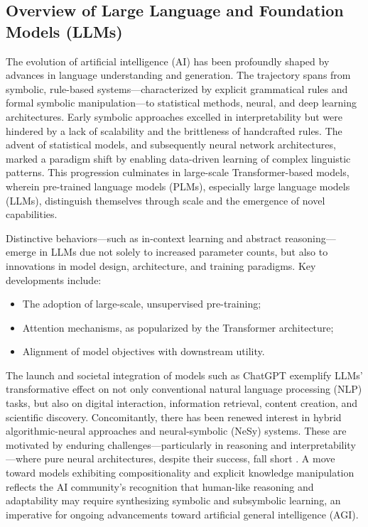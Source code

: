 \documentclass[11pt]{article}
\begin{document}
\subsection{Overview of Large Language and Foundation Models (LLMs)}

The evolution of artificial intelligence (AI) has been profoundly shaped by advances in language understanding and generation. The trajectory spans from symbolic, rule-based systems—characterized by explicit grammatical rules and formal symbolic manipulation—to statistical methods, neural, and deep learning architectures. Early symbolic approaches excelled in interpretability but were hindered by a lack of scalability and the brittleness of handcrafted rules. The advent of statistical models, and subsequently neural network architectures, marked a paradigm shift by enabling data-driven learning of complex linguistic patterns. This progression culminates in large-scale Transformer-based models, wherein pre-trained language models (PLMs), especially large language models (LLMs), distinguish themselves through scale and the emergence of novel capabilities.

Distinctive behaviors—such as in-context learning and abstract reasoning—emerge in LLMs due not solely to increased parameter counts, but also to innovations in model design, architecture, and training paradigms. Key developments include:

\begin{itemize}
    \item The adoption of large-scale, unsupervised pre-training;
    \item Attention mechanisms, as popularized by the Transformer architecture;
    \item Alignment of model objectives with downstream utility.
\end{itemize}

The launch and societal integration of models such as ChatGPT exemplify LLMs' transformative effect on not only conventional natural language processing (NLP) tasks, but also on digital interaction, information retrieval, content creation, and scientific discovery. Concomitantly, there has been renewed interest in hybrid algorithmic-neural approaches and neural-symbolic (NeSy) systems. These are motivated by enduring challenges—particularly in reasoning and interpretability—where pure neural architectures, despite their success, fall short \cite{ref42,ref49,ref54,ref86}. A move toward models exhibiting compositionality and explicit knowledge manipulation reflects the AI community’s recognition that human-like reasoning and adaptability may require synthesizing symbolic and subsymbolic learning, an imperative for ongoing advancements toward artificial general intelligence (AGI).
\end{document}
